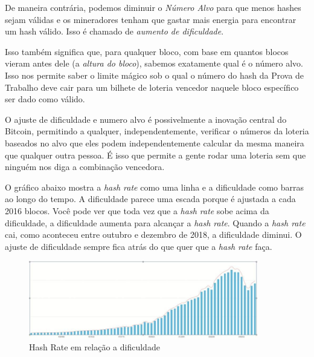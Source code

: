  De maneira contrária, podemos diminuir o \textit{Número Alvo} para que menos hashes sejam válidas e os mineradores tenham que gastar mais energia para encontrar um hash válido. Isso é chamado de \textit{aumento de dificuldade}.

Isso também significa que, para qualquer bloco, com base em quantos blocos vieram antes dele (a \textit{altura do bloco}), sabemos exatamente qual é o número alvo. Isso nos permite saber o limite mágico sob o qual o número do hash da Prova de Trabalho deve cair para um bilhete de loteria vencedor naquele bloco específico ser dado como válido.

O ajuste de dificuldade e numero alvo é possivelmente a inovação central do Bitcoin, permitindo a qualquer, independentemente, verificar o números da loteria baseados no alvo que eles podem independentemente calcular da mesma maneira que qualquer outra pessoa. É isso que permite a gente rodar uma loteria sem que ninguém nos diga a combinação vencedora.




O gráfico abaixo mostra a \textit{hash rate} como uma linha e a dificuldade como barras ao longo do tempo. A dificuldade parece uma escada porque é ajustada a cada 2016 blocos. Você pode ver que toda vez que a \textit{hash rate} sobe acima da dificuldade, a dificuldade aumenta para alcançar a \textit{hash rate}. Quando a \textit{hash rate} cai, como aconteceu entre outubro e dezembro de 2018, a dificuldade diminui. O ajuste de dificuldade sempre fica atrás do que quer que a \textit{hash rate} faça.

\begin{figure}
  \centering
  \includegraphics[width=10cm]{imagens/grafico3-capitulo-05.jpg}
  \caption{Hash Rate em relação a dificuldade}
\end{figure}

